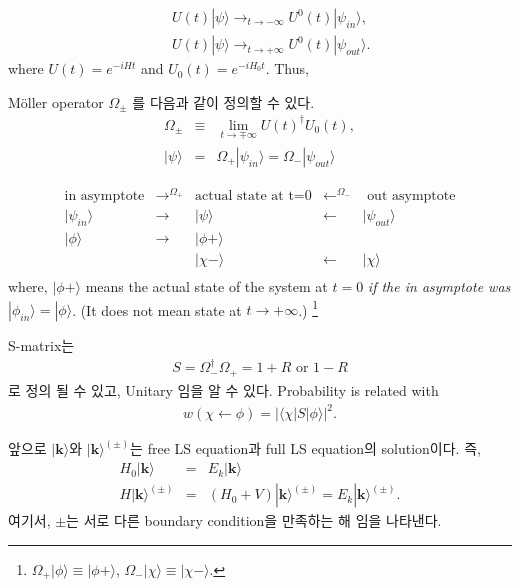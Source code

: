 \documentclass[10pt]{article}
\def\bm{\boldsymbol}
\newcommand{\bea}{\begin{eqnarray}}
\newcommand{\eea}{\end{eqnarray}}
\newcommand{\no}{\nonumber \\}
\def\vk{{\bm k}}
\def\la{\langle}
\def\ra{\rangle}
\begin{document}
\bea
& &U(t)|\psi\ra \to_{t\to -\infty}  U^0(t)|\psi_{in}\ra ,\no
& &U(t)|\psi\ra \to_{t\to +\infty}  U^0(t)|\psi_{out}\ra.
\eea
where $U(t)=e^{-iH t}$ and $U_0(t)=e^{-iH_0 t}$. Thus,

M\"{o}ller operator $\Omega_{\pm}$ 를 다음과 같이 정의할 수 있다.
\bea
\Omega_{\pm}&\equiv&\lim_{t\to \mp\infty} U(t)^\dagger U_0(t),\no
|\psi\ra&=&\Omega_{+}|\psi_{in}\ra=\Omega_{-}|\psi_{out}\ra
\eea

  
\begin{equation}
\boxed{
\begin{array}{ccccc}
\mbox{in asymptote} & \rightarrow^{\Omega_+} & \mbox{actual state at t=0}
                    & \leftarrow^{\Omega_-}  & \mbox{ out asymptote}\\
|\psi_{in}\ra       & \rightarrow            & |\psi\ra 
                    &\leftarrow              & |\psi_{out}\ra\\
|\phi\ra            &\rightarrow             &|\phi+\ra
                    &                        &  \\
                    &                        & |\chi-\ra
                    & \leftarrow             & |\chi\ra\\       
\end{array}
}
\end{equation}
where, $|\phi+\ra$ means the actual state of the system at $t=0$
{\it if the in asymptote was $|\phi_{in}\ra=|\phi\ra$}.
(It does not mean state at $t\to +\infty$.)
\footnote{$\Omega_{+}|\phi\ra\equiv |\phi+\ra$,
$\Omega_{-}|\chi\ra\equiv |\chi-\ra$.}


S-matrix는  
\bea
S=\Omega^\dagger_{-}\Omega_{+}=1+R \mbox{ or } 1-R
\eea
로 정의 될 수 있고, Unitary 임을 알 수 있다. 
Probability is related with
\bea
w(\chi\leftarrow \phi)=|\la\chi|S|\phi\ra|^2.
\eea

앞으로 
$|\vk\ra$와 $|\vk\ra^{(\pm)}$는 free LS equation과 
full LS equation의 solution이다. 즉,
\bea
H_0|\vk\ra&=&E_k|\vk\ra\no
H|\vk\ra^{(\pm)}&=&(H_0+V)|\vk\ra^{(\pm)}=E_k|\vk\ra^{(\pm)}.
\eea
여기서, $\pm$는 서로 다른 boundary condition을 만족하는 해 임을 
나타낸다.
\end{document}
